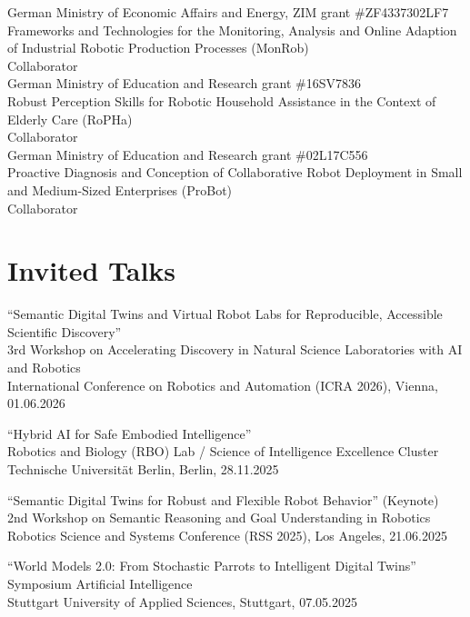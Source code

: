 \documentclass[11pt]{article} %
\begin{document}
German Ministry of Economic Affairs and Energy, ZIM grant \#ZF4337302LF7\\
Frameworks and Technologies for the Monitoring, Analysis and Online Adaption of Industrial Robotic Production Processes (MonRob)\\
Collaborator\\
German Ministry of Education and Research grant \#16SV7836\\
Robust Perception Skills for Robotic Household Assistance in the Context of Elderly Care (RoPHa)\\
Collaborator\\
German Ministry of Education and Research grant \#02L17C556\\
Proactive Diagnosis and Conception of Collaborative Robot Deployment in Small and Medium-Sized Enterprises (ProBot)\\
Collaborator\\

\section*{Invited Talks}


``Semantic Digital Twins and Virtual Robot Labs for Reproducible, Accessible Scientific Discovery''\\
3rd Workshop on Accelerating Discovery in Natural Science Laboratories with AI and Robotics\\
International Conference on Robotics and Automation (ICRA 2026), Vienna, 01.06.2026

\medskip


``Hybrid AI for Safe Embodied Intelligence''\\
Robotics and Biology (RBO) Lab / Science of Intelligence Excellence Cluster\\
Technische Universität Berlin, Berlin, 28.11.2025

\medskip

``Semantic Digital Twins for Robust and Flexible Robot Behavior'' (Keynote)\\
2nd Workshop on Semantic Reasoning and Goal Understanding in Robotics\\
Robotics Science and Systems Conference (RSS 2025), Los Angeles, 21.06.2025

\medskip

``World Models 2.0: From Stochastic Parrots to Intelligent Digital Twins''\\
Symposium Artificial Intelligence\\
Stuttgart University of Applied Sciences, Stuttgart, 07.05.2025
\end{document}
